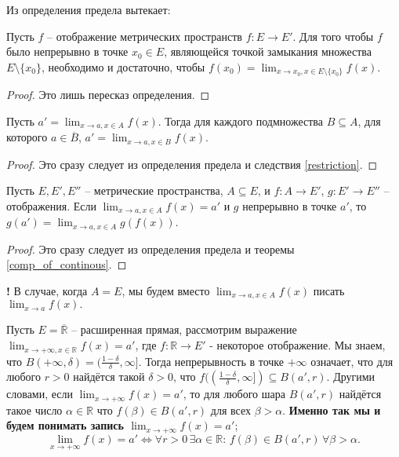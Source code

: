 Из определения предела вытекает:
\begin{theorem}\label{criteria_of_continous}
    Пусть $f$  -- отображение метрических пространств $f:E \to E'$. Для того чтобы $f$ было непрерывно в точке $x_0 \in E$, являющейся точкой замыкания множества $E\setminus\{x_0\}$, необходимо и достаточно, чтобы $f(x_0) = \lim_{x \to x_0, x\in E \setminus \{x_0\}}f(x).$
\end{theorem}
\begin{proof}
    Это лишь пересказ определения.
\end{proof}

\begin{theorem}\label{limit_for_any_subset}
    Пусть $a' = \lim_{x \to a, x \in A} f(x)$. Тогда для каждого подмножества $B \subseteq A$, для которого $a \in \overline{B}$, $a' = \lim_{x \to a, x \in B}f(x)$.
\end{theorem}

\begin{proof}
    Это сразу следует из определения предела и следствия \ref{restriction}.
\end{proof}

\begin{theorem}\label{lim_of_composition}
    Пусть $E,E',E''$ -- метрические пространства, $A \subseteq E$, и $f:A \to E'$, $g:E' \to E''$ -- отображения. Если $\lim_{x \to a, x \in A}f(x) = a'$ и $g$ непрерывно в точке $a'$, то $g(a') = \lim_{x \to a, x \in A}g(f(x))$. 
\end{theorem}
\begin{proof}
    Это сразу следует из определения предела и теоремы \ref{comp_of_continous}.
\end{proof}

\begin{mydanger}{\bf{!}}
    В случае, когда $A = E$, мы будем вместо $\lim_{x \to a, x \in A}f(x)$  писать $\lim_{x \to a}f(x).$
\end{mydanger}

\begin{remark}
 Пусть $E = \overline{\mathbb{R}}$ -- расширенная прямая, рассмотрим выражение $\lim_{x \to +\infty, x \in \mathbb{{R}}}f(x) = a'$, где $f:\mathbb{R} \to E' $ - некоторое отображение. Мы знаем, что $B(+\infty, \delta) = (\frac{1-\delta}{\delta}, \infty]$. Тогда непрерывность в точке $+\infty$ означает, что для любого $r >0$ найдётся такой $\delta>0$, что $f((\frac{1-\delta}{\delta}, \infty]) \subseteq B(a',r)$. Другими словами, если $\lim_{x \to + \infty} f(x) = a'$, то для любого шара $B(a',r)$ найдётся такое число $\alpha \in \mathbb{R}$ что $f(\beta) \in B(a',r)$ для всех $\beta > \alpha.$ \textbf{Именно так мы и будем понимать запись $\lim_{x \to +\infty}f(x) = a'$};
 \[
  \boxed{ 
    \boxed{
    \lim_{x \to +\infty}f(x) = a' \Longleftrightarrow \forall r > 0\, \exists \alpha \in \mathbb{R}:\, f(\beta) \in B(a',r) \,\forall \beta >\alpha.
    }
}
 \]
\end{remark}

